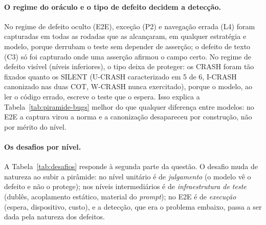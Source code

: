 \documentclass[12pt]{article}
\begin{document}
\paragraph{O regime do oráculo e o tipo de defeito decidem a detecção.}
No regime de defeito oculto (E2E), exceção (P2) e navegação errada (L4)
foram capturadas em todas as rodadas que as alcançaram, em qualquer
estratégia e modelo, porque derrubam o teste sem depender de asserção; o
defeito de texto (C3) só foi capturado onde uma asserção afirmou o campo
certo. No regime de defeito visível (níveis inferiores), o tipo deixa de
proteger: os CRASH foram tão fixados quanto os SILENT (U-CRASH
caracterizado em 5 de 6, I-CRASH canonizado nas duas COT, W-CRASH nunca
exercitado), porque o modelo, ao ler o código errado, escreve o teste que
o espera. Isso explica a Tabela~\ref{tab:piramide-bugs} melhor do que
qualquer diferença entre modelos: no E2E a captura virou a norma e a
canonização desapareceu por construção, não por mérito do nível.

\paragraph{Os desafios por nível.} A Tabela~\ref{tab:desafios} responde à
segunda parte da questão. O desafio muda de natureza ao subir a pirâmide: no
nível unitário é de \emph{julgamento} (o modelo vê o defeito e não o
protege); nos níveis intermediários é de \emph{infraestrutura de teste}
(dublês, acoplamento estático, material do \textit{prompt}); no E2E é de
\emph{execução} (espera, dispositivo, custo), e a detecção, que era o
problema embaixo, passa a ser dada pela natureza dos defeitos.
\end{document}
